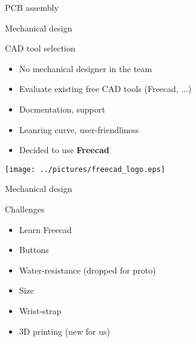 \documentclass[compress,red]{beamer}
\begin{document}
\begin{frame}{PCB assembly}

  \begin{center}
  \end{center}

  \note[item]{}

\end{frame}

\begin{frame}{Mechanical design}

  \begin{block}{CAD tool selection}
    \begin{itemize}
    \item No mechanical designer in the team
    \item Evaluate existing free CAD tools (Freecad, ...)
    \item Docmentation, support
    \item Leanring curve, user-friendliness
    \end{itemize}
  \end{block}

  \begin{itemize}
  \item Decided to use \textbf{Freecad}
  \end{itemize}

  \begin{center}
    \texttt{[image: ../pictures/freecad\_logo.eps]}
  \end{center}

\end{frame}

\begin{frame}{Mechanical design}

  \begin{block}{Challenges}
    \begin{itemize}
    \item Learn Freecad
    \item Buttons
    \item Water-resistance (dropped for proto)
    \item Size
    \item Wrist-strap
    \item 3D printing (new for us)
    \end{itemize}
  \end{block}

\end{frame}
\end{document}
